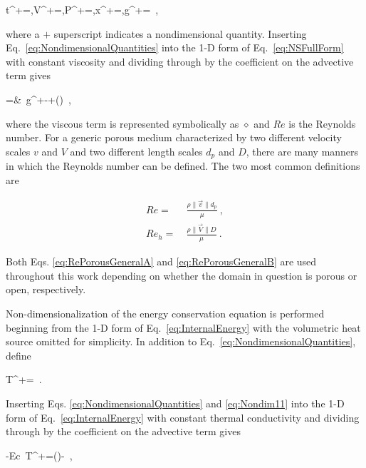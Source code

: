 \beq
\label{eq:NondimensionalQuantities}
t^+=,\quad V^+=,\quad P^+=,\quad x^+=,\quad g^+=\ ,
\eeq

\noindent where a \(+\) superscript indicates a nondimensional quantity. Inserting Eq.\ \eqref{eq:NondimensionalQuantities} into the 1-D form of Eq.\ \eqref{eq:NSFullForm} with constant viscosity and dividing through by the coefficient on the advective term gives

\beqa
\label{eq:NondimensionalNS2}
=&\ g^+-+\left(\diamond\right)\ ,
\eeqa

\noindent where the viscous term is represented symbolically as \(\diamond\) and \(Re\) is the Reynolds number. For a generic porous medium characterized by two different velocity scales \(v\) and \(V\) and two different length scales \(d_p\) and \(D\), there are many manners in which the Reynolds number can be defined. The two most common definitions are

\begin{subequations}
\label{eq:RePorousGeneral}
\begin{align}
\label{eq:RePorousGeneralA}
Re=&\ \frac{\rho \|\vec{v}\|d_p}{\mu}\ ,\\
\label{eq:RePorousGeneralB}
Re_h=&\ \frac{\rho \|\vec{V}\|D}{\mu}\ .
\end{align}
\end{subequations}

\noindent Both Eqs. \eqref{eq:RePorousGeneralA} and \eqref{eq:RePorousGeneralB} are used throughout this work depending on whether the domain in question is porous or open, respectively. 

Non-dimensionalization of the energy conservation equation is performed beginning from the 1-D form of Eq.\ \eqref{eq:InternalEnergy} with the volumetric heat source omitted for simplicity. In addition to Eq.\ \eqref{eq:NondimensionalQuantities}, define

\beq
\label{eq:Nondim11}
T^+=\ .
\eeq

\noindent Inserting Eqs. \eqref{eq:NondimensionalQuantities} and \eqref{eq:Nondim11} into the 1-D form of Eq.\ \eqref{eq:InternalEnergy} with constant thermal conductivity and dividing through by the coefficient on the advective term gives

\beq
\label{eq:NondimensionalTemperatureEqn}
-\beta Ec\ T^+=(\diamond)-\ ,
\eeq

